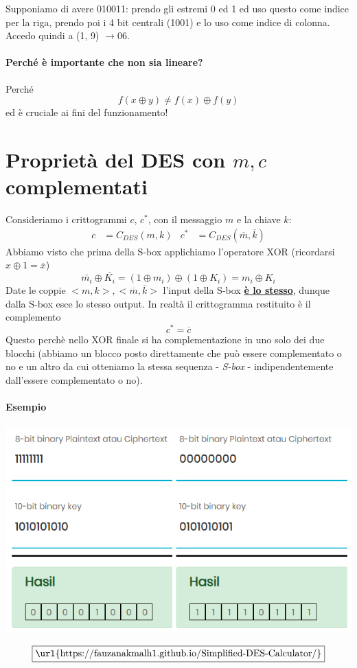 \noindent Supponiamo di avere 010011: prendo gli estremi 0 ed 1 ed uso questo come indice per la riga, prendo poi i 4 bit centrali (1001) e lo uso come indice di colonna. Accedo quindi a (1, 9) $\xrightarrow{} 06$.

\paragraph{Perché è importante che non sia lineare?} Perché $$f(x \oplus y) \neq f(x) \oplus f(y)$$ ed è cruciale ai fini del funzionamento!

\section{Proprietà del DES con $m,c$ complementati}
Consideriamo i crittogrammi $c$, $c^{*}$, con il messaggio $m$ e la chiave $k$:
\begin{align*}
	c &= C_{DES}(m, k)&	c^{*} &= C_{DES}(\overline{m}, \overline{k})
\end{align*}
Abbiamo visto che prima della S-box applichiamo l'operatore XOR (ricordarsi $x \oplus 1=\overline{x}$)
$$ \bar{m_i} \oplus \bar{K_i} = (1 \oplus m_i) \oplus (1 \oplus K_i) = m_i \oplus K_i $$
Date le coppie $<m,k>, <\overline{m},\overline{k}>$ l'input della S-box \textbf{\underline{è lo stesso}}, dunque dalla S-box esce lo stesso output. In realtà il crittogramma restituito è il complemento
$$c^{*}=\overline{c}$$
Questo perchè nello XOR finale si ha complementazione in uno solo dei due blocchi (abbiamo un blocco posto direttamente che può essere complementato o no e un altro da cui otteniamo la stessa sequenza - \textit{S-box} - indipendentemente dall'essere complementato o no).
\paragraph{Esempio}
\begin{center}
	\includegraphics[scale=.75]{images/21.PNG}
\end{center}
\[\boxed{\text{\url{https://fauzanakmalh1.github.io/Simplified-DES-Calculator/}}}\]

